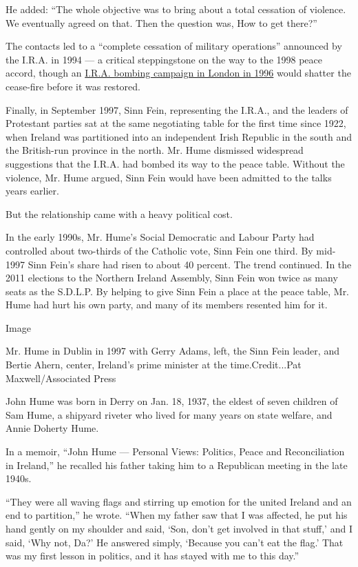 He added: ``The whole objective was to bring about a total cessation of
violence. We eventually agreed on that. Then the question was, How to
get there?''

The contacts led to a ``complete cessation of military operations''
announced by the I.R.A. in 1994 --- a critical steppingstone on the way
to the 1998 peace accord, though an
\href{https://www.nytimes.com/1996/02/10/world/bomb-wounds-100-in-london-as-ira-truce-is-said-to-end.html}{I.R.A.
bombing campaign in London in 1996} would shatter the cease-fire before
it was restored.

Finally, in September 1997, Sinn Fein, representing the I.R.A., and the
leaders of Protestant parties sat at the same negotiating table for the
first time since 1922, when Ireland was partitioned into an independent
Irish Republic in the south and the British-run province in the north.
Mr. Hume dismissed widespread suggestions that the I.R.A. had bombed its
way to the peace table. Without the violence, Mr. Hume argued, Sinn Fein
would have been admitted to the talks years earlier.

But the relationship came with a heavy political cost.

In the early 1990s, Mr. Hume's Social Democratic and Labour Party had
controlled about two-thirds of the Catholic vote, Sinn Fein one third.
By mid-1997 Sinn Fein's share had risen to about 40 percent. The trend
continued. In the 2011 elections to the Northern Ireland Assembly, Sinn
Fein won twice as many seats as the S.D.L.P. By helping to give Sinn
Fein a place at the peace table, Mr. Hume had hurt his own party, and
many of its members resented him for it.

Image

Mr. Hume in Dublin in 1997 with Gerry Adams, left, the Sinn Fein leader,
and Bertie Ahern, center, Ireland's prime minister at the
time.Credit...Pat Maxwell/Associated Press

John Hume was born in Derry on Jan. 18, 1937, the eldest of seven
children of Sam Hume, a shipyard riveter who lived for many years on
state welfare, and Annie Doherty Hume.

In a memoir, ``John Hume --- Personal Views: Politics, Peace and
Reconciliation in Ireland,'' he recalled his father taking him to a
Republican meeting in the late 1940s.

``They were all waving flags and stirring up emotion for the united
Ireland and an end to partition,'' he wrote. ``When my father saw that I
was affected, he put his hand gently on my shoulder and said, `Son,
don't get involved in that stuff,' and I said, `Why not, Da?' He
answered simply, `Because you can't eat the flag.' That was my first
lesson in politics, and it has stayed with me to this day.''

